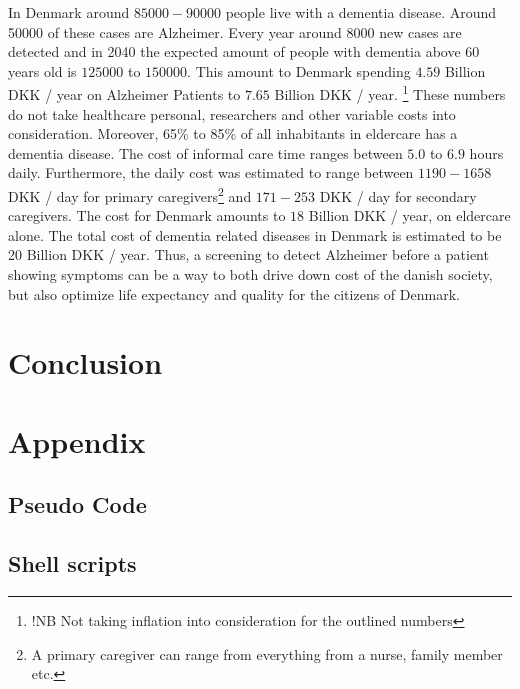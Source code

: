 \documentclass[12pt, fleqn, titlepage]{article}
\begin{document}
		In Denmark around $ 85000-90000 $ people live with a dementia disease. Around 50000 of these cases are Alzheimer. Every year around $ 8000 $ new cases are detected and in 2040 the expected amount of people with dementia above 60 years old is $ 125000 $ to $ 150000 $. This amount to Denmark spending $ 4.59 $ Billion DKK / year on Alzheimer Patients to $ 7.65 $ Billion DKK / year. \footnote{!NB Not taking inflation into consideration for the outlined numbers} These numbers do not take healthcare personal, researchers and other variable costs into consideration. Moreover, 65\% to 85\% of all inhabitants in eldercare has a dementia disease. The cost of informal care time ranges between $ 5.0 $ to $ 6.9 $ hours daily. Furthermore, the daily cost was estimated to range between $ 1190 - 1658 $ DKK / day for primary caregivers\footnote{A primary caregiver can range from everything from a nurse, family member etc.} and $ 171 - 253 $ DKK / day for secondary caregivers. The cost for Denmark amounts to $ 18 $ Billion DKK / year, on eldercare alone. The total cost of dementia related diseases in Denmark is estimated to be 20 Billion DKK / year.  \cite{Alzheimerforeningen} \cite{informal_care} Thus, a screening to detect Alzheimer before a patient showing symptoms can be a way to both drive down cost of the danish society, but also optimize life expectancy and quality for the citizens of Denmark.
		

\section{Conclusion}\label{conclusion}



\newpage
\section{Appendix}\label{appendix}

\subsection{Pseudo Code}

\subsection{Shell scripts}
\end{document}
